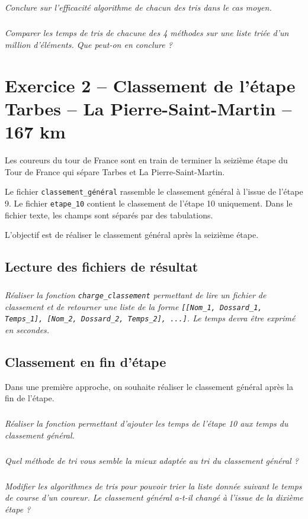\documentclass[10pt,fleqn]{article} %
\begin{document}
\begin{multicols}{2}
\subparagraph{}
\textit{Conclure sur l'efficacité algorithme de chacun des tris dans le cas moyen.}

\subparagraph{}
\textit{Comparer les temps de tris de chacune des 4 méthodes sur une liste triée d'un million d'éléments. Que peut-on en conclure ?}




\section*{Exercice 2 -- Classement de l'étape Tarbes -- La Pierre-Saint-Martin -- 167 km}
Les coureurs du tour de France sont en train de terminer la seizième étape du Tour de France qui sépare Tarbes et La Pierre-Saint-Martin. 

Le fichier \texttt{classement\_général} rassemble le classement général à l'issue de l'étape 9. Le fichier \texttt{etape\_10} contient le classement de l'étape 10 uniquement. Dans le fichier texte, les champs sont séparés par des tabulations.


\begin{obj}
L'objectif est de réaliser le classement général après la seizième étape. 
\end{obj}

\subsection*{Lecture des fichiers de résultat}
\setcounter{exo}{0}
\subparagraph{}
\textit{Réaliser la fonction \texttt{charge\_classement} permettant de lire un fichier de classement 
et de retourner une liste de la forme \texttt{[[Nom\_1, Dossard\_1, Temps\_1], [Nom\_2, Dossard\_2, Temps\_2], ...]}. Le temps devra être exprimé en secondes.}



\subsection*{Classement en fin d'étape}
Dans une première approche, on souhaite réaliser le classement général après la fin de l'étape. 

\subparagraph{}
\textit{Réaliser la fonction permettant d'ajouter les temps de l'étape 10 aux temps du classement général.}

\subparagraph{}
\textit{Quel méthode de tri vous semble la mieux adaptée au tri du classement général ?}

\subparagraph{}
\textit{Modifier les algorithmes de tris pour pouvoir trier la liste donnée suivant le temps de course d'un coureur. Le classement général a-t-il changé à l'issue de la dixième étape ?}


\end{multicols}
\end{document}
